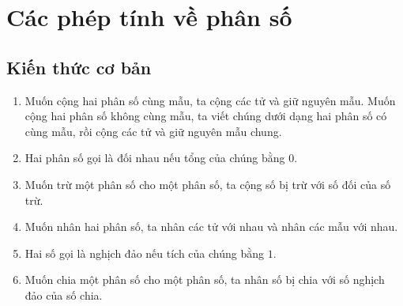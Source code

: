 \section{Các phép tính về phân số}
\subsection{Kiến thức cơ bản}
\begin{enumerate}
	\item Muốn cộng hai phân số cùng mẫu, ta cộng các tử và giữ nguyên mẫu. Muốn cộng hai phân số không cùng mẫu, ta viết chúng dưới dạng hai phân số có cùng mẫu, rồi cộng các tử và giữ nguyên mẫu chung.
	\item Hai phân số gọi là đối nhau nếu tổng của chúng bằng $0$.
	\item Muốn trừ một phân số cho một phân số, ta cộng số bị trừ với số đối của số trừ.
	\item Muốn nhân hai phân số, ta nhân các tử với nhau và nhân các mẫu với nhau.
	\item Hai số gọi là nghịch đảo nếu tích của chúng bằng $1$.
	\item Muốn chia một phân số cho một phân số, ta nhân số bị chia với số nghịch đảo của số chia.
\end{enumerate}
